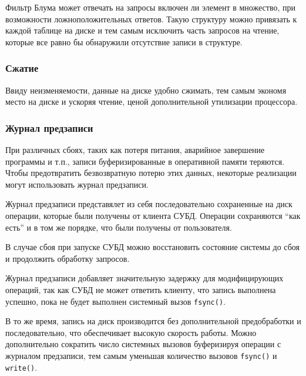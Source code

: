 \documentclass[14pt, russian]{scrartcl}
\begin{document}
Фильтр Блума может отвечать на запросы включен ли элемент в множество, при
возможности ложноположительных ответов. Такую структуру можно привязать к каждой
таблице на диске и тем самым исключить часть запросов на чтение, которые все
равно бы обнаружили отсутствие записи в структуре.


\subsubsection{Сжатие}

Ввиду неизменяемости, данные на диске удобно сжимать, тем самым экономя место на
диске и ускоряя чтение, ценой дополнительной утилизации процессора.


\subsubsection{Журнал предзаписи}

При различных сбоях, таких как потеря питания, аварийное завершение программы и
т.п., записи буферизированные в оперативной памяти теряются. Чтобы предотвратить
безвозвратную потерю этих данных, некоторые реализации могут использовать журнал
предзаписи.

Журнал предзаписи представялет из себя последовательно сохраненные на диск
операции, которые были получены от клиента СУБД. Операции сохраняются ``как
есть'' и в том же порядке, что были получены от пользователя.

В случае сбоя при запуске СУБД можно восстановить состояние системы до сбоя и
продолжить обработку запросов.

Журнал предзаписи добавляет значительную задержку для модифицирующих операций,
так как СУБД не может ответить клиенту, что запись выполнена успешно, пока не
будет выполнен системный вызов \verb|fsync()|.

В то же время, запись на диск производится без дополнительной предобработки и
последовательно, что обеспечивает высокую скорость работы. Можно дополнительно
сократить число системных вызовов буферизируя операции с журналом предзаписи,
тем самым уменьшая количество вызовов \verb|fsync()| и \verb|write()|.
\end{document}
